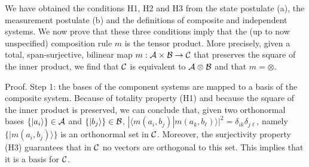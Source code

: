 \documentclass[aps,prl,amsmath,amssymb,twocolumn,nofootinbib]{revtex4}
\theoremstyle{plain}
\theoremstyle{definition}
\theoremstyle{remark}
\def\>{\rangle}
\def\<{\langle}
\begin{document}
	We have obtained the conditions H1, H2 and H3 from the state postulate
	(a), the measurement postulate (b) and the definitions of composite
	and independent systems. We now prove that these three conditions
	imply that the (up to now unspecified) composition rule $m$ is the
	tensor product. More precisely, given a total, span-surjective,
	bilinear map $m:{\cal A}\times{\cal B}\to{\cal C}$ that preserves the
	square of the inner product, we find that $\cal C $ is equivalent to
	$\cal A \otimes \cal B $ and that $m=\otimes$.
	
	Proof. Step 1: the bases of the component systems are mapped to a basis of
	the composite system. Because of totality property (H1) and because
	the square of the inner product is preserved, we can conclude that,
	given two orthonormal bases $\{|a_i\>\}\in{\cal A}$ and
	$\{|b_j\>\}\in{\cal B}$,
	$|\<m(a_i,b_j)|m(a_k,b_\ell)\>|^2=\delta_{ik}\delta_{j\ell}$, namely
	$\{|m(a_i,b_j)\>\}$ is an orthonormal set in $\cal C$.  Moreover, the
	surjectivity property (H3) guarantees that in $\cal C$ no vectors are
	orthogonal to this set. This implies that it is a basis for $\cal C$.
	
\end{document}
